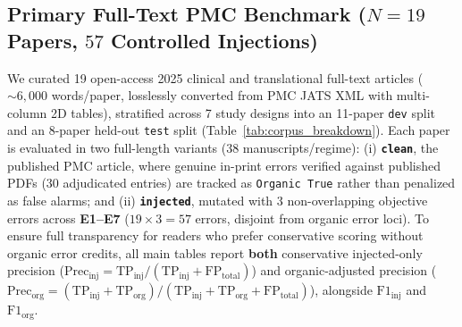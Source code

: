 \documentclass[11pt,a4paper]{article}
\begin{document}
\subsection{Primary Full-Text PMC Benchmark (\texorpdfstring{$N=19$}{N=19} Papers, \texorpdfstring{$57$}{57} Controlled Injections)}
We curated 19 open-access 2025 clinical and translational full-text articles ($\sim 6{,}000$ words/paper, losslessly converted from PMC JATS XML with multi-column 2D tables), stratified across 7 study designs into an 11-paper \texttt{dev} split and an 8-paper held-out \texttt{test} split (Table~\ref{tab:corpus_breakdown}). Each paper is evaluated in two full-length variants ($38$ manuscripts/regime): (i) \textbf{\texttt{clean}}, the published PMC article, where genuine in-print errors verified against published PDFs ($30$ adjudicated entries) are tracked as \texttt{Organic True} rather than penalized as false alarms; and (ii) \textbf{\texttt{injected}}, mutated with $3$ non-overlapping objective errors across \textbf{E1--E7} ($19 \times 3 = 57$ errors, disjoint from organic error loci). To ensure full transparency for readers who prefer conservative scoring without organic error credits, all main tables report \textbf{both} conservative injected-only precision ($\text{Prec}_{\text{inj}} = \text{TP}_{\text{inj}} / (\text{TP}_{\text{inj}} + \text{FP}_{\text{total}})$) and organic-adjusted precision ($\text{Prec}_{\text{org}} = (\text{TP}_{\text{inj}} + \text{TP}_{\text{org}}) / (\text{TP}_{\text{inj}} + \text{TP}_{\text{org}} + \text{FP}_{\text{total}})$), alongside $\text{F1}_{\text{inj}}$ and $\text{F1}_{\text{org}}$.
\end{document}
